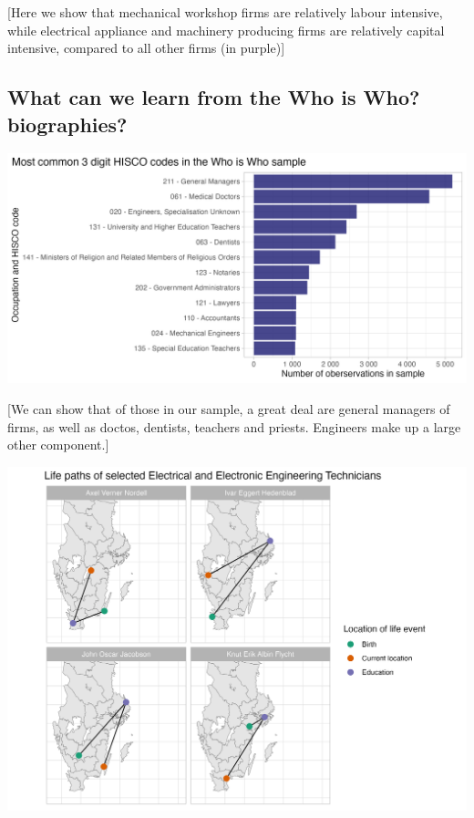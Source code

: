 \documentclass[
]{article}
\begin{document}
{[}Here we show that mechanical workshop firms are relatively labour
intensive, while electrical appliance and machinery producing firms are
relatively capital intensive, compared to all other firms (in purple){]}

\hypertarget{what-can-we-learn-from-the-who-is-who-biographies}{%
\subsection{What can we learn from the Who is Who?
biographies?}\label{what-can-we-learn-from-the-who-is-who-biographies}}

\includegraphics{assets/hisco_counts.png}

{[}We can show that of those in our sample, a great deal are general
managers of firms, as well as doctos, dentists, teachers and priests.
Engineers make up a large other component.{]}

\includegraphics{assets/eee_map.png}
\end{document}
